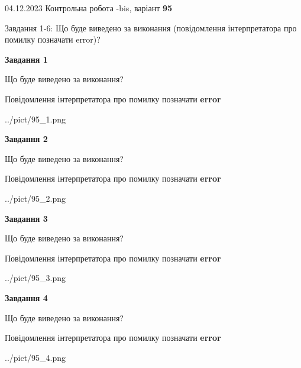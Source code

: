 \documentclass[12pt, ukrainian]{article}
\begin{document}
{{04.12.2023 Контрольна робота -bis, варіант  \No \textbf { 95 }\par}}
{

Завдання 1-6: Що буде виведено за виконання (повідомлення інтерпретатора про помилку позначати error)?


{\begin {center}\textbf{Завдання 1}\end {center}}\par
Що буде виведено за виконання? \par
Повідомлення інтерпретатора про помилку позначати \textbf{error}

\begin{center}
	{../pict/95_1.png}
\end{center}
\newpage

{\begin {center}\textbf{Завдання 2}\end {center}}\par
Що буде виведено за виконання? \par
Повідомлення інтерпретатора про помилку позначати \textbf{error}

\begin{center}
	{../pict/95_2.png}
\end{center}
\newpage

{\begin {center}\textbf{Завдання 3}\end {center}}\par
Що буде виведено за виконання? \par
Повідомлення інтерпретатора про помилку позначати \textbf{error}

\begin{center}
	{../pict/95_3.png}
\end{center}
\newpage

{\begin {center}\textbf{Завдання 4}\end {center}}\par
Що буде виведено за виконання? \par
Повідомлення інтерпретатора про помилку позначати \textbf{error}

\begin{center}
	{../pict/95_4.png}
\end{center}
\newpage

}
\end{document}
